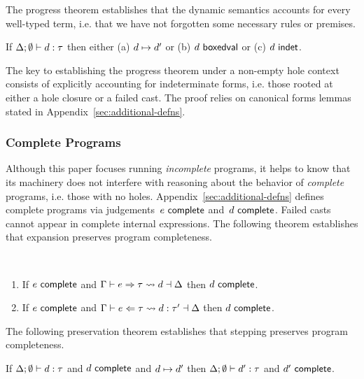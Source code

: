 The progress theorem establishes that the dynamic semantics accounts
for every well-typed term, i.e. that we have not forgotten some
necessary rules or premises.
%
\begin{thm}[Progress]
  If $\Delta; \emptyset \vdash d : \tau$ then either
  (a) $d \mapsto d'$ or
  (b) $d~\mathsf{boxedval}$ or 
  (c) $d~\mathsf{indet}$.
\end{thm}
\noindent
The key to establishing the progress theorem under a non-empty hole
context consists of explicitly accounting for indeterminate forms,
i.e. those rooted at either a hole closure or a failed cast.
%
The proof relies on canonical forms lemmas stated in
Appendix~\ref{sec:additional-defns}.

\subsubsection{Complete Programs} 
%
Although this paper focuses running \emph{incomplete} programs, it helps
to know that its machinery does not interfere
with reasoning about the behavior of \emph{complete} programs, i.e. those
with no holes.
%
Appendix~\ref{sec:additional-defns} defines complete programs via judgements~$e~\mathsf{complete}$ and~$d~\mathsf{complete}$. 
%
Failed casts cannot appear in complete internal expressions. 
%
The following theorem establishes that expansion preserves program completeness.
\begin{thm} ~
  \begin{enumerate}[nolistsep]
    \item
      If $e~\mathsf{complete}$
      and $\Gamma \vdash e \Rightarrow \tau \leadsto d \dashv \Delta$
      then $d~\mathsf{complete}$.
    \item
      If $e~\mathsf{complete}$
      and $\Gamma \vdash e \Leftarrow \tau \leadsto d : \tau' \dashv \Delta$
      then $d~\mathsf{complete}$.
  \end{enumerate}
\end{thm}

The following preservation theorem establishes that stepping preserves program completeness.
\begin{thm}
  If $\Delta; \emptyset \vdash d : \tau$
  and $d~\mathsf{complete}$
  and $d \mapsto d'$
  then $\Delta; \emptyset \vdash d' : \tau$
  and $d'~\mathsf{complete}$.
\end{thm}

